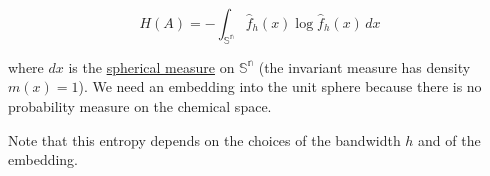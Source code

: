 \[ H(A) = -\int_\mathbb{{S}^n}  \hat{f}_h(x)\log  \hat{f}_h(x) \,dx  \]



where $dx$ is the \href{https://en.wikipedia.org/wiki/Spherical_measure}{spherical measure} on $\mathbb{{S}^n}$ (the invariant measure has density $m(x)=1$). We need an embedding into the unit sphere because there is no probability measure on the chemical space.

Note that this entropy depends on the choices of the bandwidth $h$ and of the embedding.
